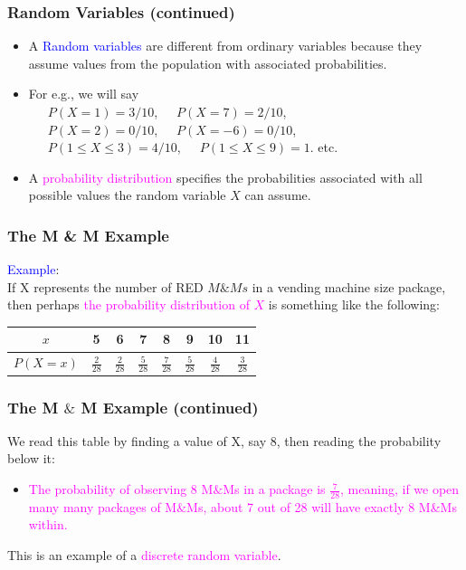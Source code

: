 \documentclass[xcolor=dvipsnames,12pt]{beamer}
\begin{document}
\begin{frame}
\frametitle{Random Variables (continued)}
\begin{itemize}
\item A {\textcolor{blue}{Random variables}} are different from
ordinary variables because they assume values from the population
with associated probabilities. 
\item For e.g., we will say \\[.01in] 
\ \ \ $P(X=1)=3/10$,\ \ \ $P(X=7)=2/10$, \\
\ \ \ $P(X=2)=0/10$,\ \ \ $P(X=-6)=0/10$, \\
\ \ \ $P(1 \leq X \leq 3)=4/10$,\ \ \ $P(1 \leq X \leq 9)=1$. etc.
\item A \textcolor{magenta}{probability distribution} specifies the
probabilities  associated with all possible values the
random variable $X$ can assume.\\
\end{itemize}
\end{frame}



\begin{frame}
\frametitle{The M \& M Example}
\textcolor{blue}{Example}:\\
If X represents the number of RED $M\&Ms$ in a vending machine size
package, then perhaps \textcolor{magenta}{the probability distribution of $X$} is 
something like the following:\\

\begin{tabular}{|c|ccccccc|}
\hline
$x$ & 5 & 6 & 7 & 8& 9& 10 & 11 \\ \hline
$P(X=x)$ &
$\frac{2}{28} $ & $\frac{2}{28}$ & $\frac{5}{28}$ & $\frac{7}{28}$ &
$\frac{5}{28} $ & $\frac{4}{28}$ & $\frac{3}{28}$ \\ \hline
\end{tabular}
\end{frame}


\begin{frame}
\frametitle{The M $\&$ M Example (continued)}
  We read this table by finding a value of X, say 8, then 
reading the probability below it: 
\begin{itemize}
\item \textcolor{magenta}{The probability of observing 8 M$\&$Ms in a package is
$\frac{7}{28}$, meaning, if we open many many packages of M$\&$Ms,
about 7 out of 28 will have exactly 8 M\&Ms within.}
\end{itemize}
This is an example of a \textcolor{magenta}{discrete random variable}.
\end{frame}
\end{document}
